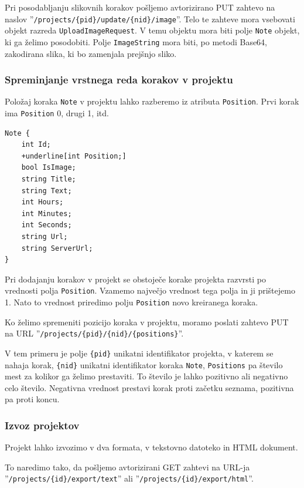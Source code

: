 \documentclass[a4paper, 12pt]{book}
\begin{document}
Pri posodabljanju slikovnih korakov pošljemo avtorizirano PUT zahtevo na naslov ''\texttt{/projects/\{pid\}/update/\{nid\}/image}''.
Telo te zahteve mora vsebovati objekt razreda \texttt{UploadImageRequest}.
V temu objektu mora biti polje \texttt{Note} objekt, ki ga želimo posodobiti.
Polje \texttt{ImageString} mora biti, po metodi Base64, zakodirana slika, ki bo zamenjala prejšnjo sliko.

\subsubsection{Spreminjanje vrstnega reda korakov v projektu}

Položaj koraka \texttt{Note} v projektu lahko razberemo iz atributa \texttt{Position}.
Prvi korak ima \texttt{Position} 0, drugi 1, itd.

\begin{Verbatim}[commandchars=+\[\]]
Note { 
    int Id; 
    +underline[int Position;]
    bool IsImage;  
    string Title; 
    string Text;
    int Hours; 
    int Minutes;
    int Seconds;
    string Url;
    string ServerUrl;
}
\end{Verbatim}

Pri dodajanju korakov v projekt se obstoječe korake projekta razvrsti po vrednosti polja \texttt{Position}.
Vzamemo največjo vrednost tega polja in ji prištejemo 1.
Nato to vrednost priredimo polju \texttt{Position} novo kreiranega koraka.

Ko želimo spremeniti pozicijo koraka v projektu, moramo poslati zahtevo PUT na URL ''\texttt{/projects/\{pid\}/\{nid\}/\{positions\}}''.

V tem primeru je polje \texttt{\{pid\}} unikatni identifikator projekta, v katerem se nahaja korak, \texttt{\{nid\}} unikatni identifikator koraka \texttt{Note}, \texttt{Positions} pa število mest za kolikor ga želimo prestaviti.
To število je lahko pozitivno ali negativno celo število.
Negativna vrednost prestavi korak proti začetku seznama, pozitivna pa proti koncu.

\subsubsection{Izvoz projektov}

Projekt lahko izvozimo v dva formata, v tekstovno datoteko in HTML dokument.

To naredimo tako, da pošljemo avtorizirani GET zahtevi na URL-ja ''\texttt{/projects/\{id\}/export/text}'' ali ''\texttt{/projects/\{id\}/export/html}''.
\end{document}
